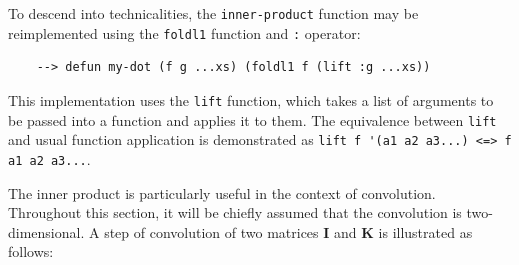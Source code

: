 To descend into technicalities, the \verb|inner-product| function may be reimplemented using the \verb|foldl1| function and \verb|:| operator:

\begin{Verbatim}
    --> defun my-dot (f g ...xs) (foldl1 f (lift :g ...xs))
\end{Verbatim}

This implementation uses the \verb|lift| function, which takes a list of arguments to be passed into a function and applies it to them. The equivalence between \verb|lift| and usual function application is demonstrated as \verb|lift f '(a1 a2 a3...) <=> f a1 a2 a3...|.

The inner product is particularly useful in the context of convolution. Throughout this section, it will be chiefly assumed that the convolution is two-dimensional. A step of convolution of two matrices $\mathbf{I}$ and $\mathbf{K}$ is illustrated as follows:

